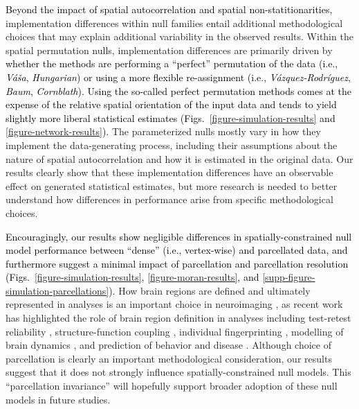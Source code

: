 \documentclass[12pt,aps,pra,reprint,showkeys]{revtex4-1}
\newcommand{\nimg}[1]{\textcolor{black}{{#1}}}
\begin{document}
\nimg{Beyond the impact of spatial autocorrelation and spatial non-statitionarities,} implementation differences within null families entail additional methodological choices that may  explain additional variability in the observed results.
Within the spatial permutation nulls, implementation differences are primarily driven by \nimg{whether the methods are performing a ``perfect'' permutation of the data (i.e., \textit{V{\'a}{\v{s}}a}, \textit{Hungarian}) or using a more flexible re-assignment (i.e., \textit{V{\'a}zquez-Rodr{\'i}guez}, \textit{Baum}, \textit{Cornblath}).
Using the so-called perfect permutation methods comes at the expense of the relative spatial orientation of the input data and tends to yield slightly more liberal statistical estimates (Figs.~\ref{figure-simulation-results} and \ref{figure-network-results}).}
The parameterized nulls mostly vary in how they implement the data-generating process, including their assumptions about the nature of spatial autocorrelation and how it is estimated in the original data.
Our results clearly show that these implementation differences have an observable effect on generated statistical estimates, but more research is needed to better understand how differences in performance arise from specific methodological choices.

\nimg{Encouragingly, our results show negligible differences in spatially-constrained null model performance between ``dense'' (i.e., vertex-wise) and parcellated data, and furthermore suggest a minimal impact of parcellation and parcellation resolution (Figs.~\ref{figure-simulation-results}, \ref{figure-moran-results}, and \ref{supp-figure-simulation-parcellations}).}
How brain regions are defined and ultimately represented in analyses is an important choice in neuroimaging \citep{eickhoff2018natrevneuro}, as recent work has highlighted the role of brain region definition in analyses including test-retest reliability \citep{arslan2018neuroimage}, structure-function coupling \citep{messe2020hbm, vazquezrodriguez2019pnas}, individual fingerprinting \citep{finn2015natneuro}, modelling of brain dynamics \citep{proix2016neuroimage}, and prediction of behavior and disease \citep{kong2019spatial, dadi2020neuroimage}.
Although choice of parcellation is clearly an important methodological consideration, our results suggest that it does not strongly influence spatially-constrained null models.
This ``parcellation invariance'' will hopefully support broader adoption of these null models in future studies.
\end{document}
